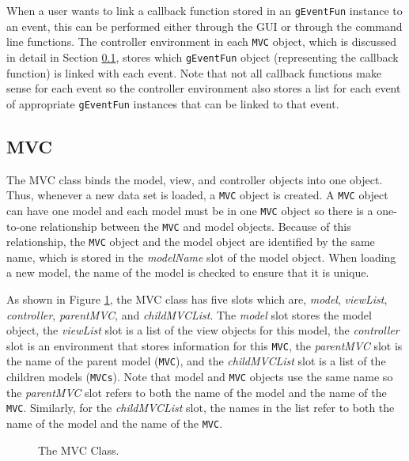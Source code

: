 \documentclass{article}[11pt]
\newcommand{\Robject}[1]{{\texttt{#1}}}
\newcommand{\Rslot}[1]{\textsl{#1}}
\newcommand{\Rclass}[1]{\textsf{#1}}
\begin{document}
When a user wants to link a callback function stored in an \Robject{gEventFun}
instance to an event, this can be performed either through the GUI or through
the command line functions.  The controller environment in each \Robject{MVC}
object, which is discussed in detail in Section \ref{Ssec:OneMVC},
stores which \Robject{gEventFun} object (representing the callback
function) is linked with each event.  Note that not all callback functions
make sense for each event so the controller environment also stores a list
for each event of appropriate \Robject{gEventFun} instances that can be linked
to that event.

\subsection{MVC}\label{Ssec:OneMVC}
 
The \Rclass{MVC} class binds the model, view, and
controller objects into one object.  Thus, whenever a new data set
is loaded, a \Robject{MVC} object is created.  A \Robject{MVC} object can have
one model and each model must be in one \Robject{MVC}
object so there is a one-to-one relationship between the \Robject{MVC} and
model objects.  Because of this relationship, the \Robject{MVC}
object and the model object are identified by the same name, which
is stored in the \Rslot{modelName} slot of the model object.  When
loading a new model, the name of the model is checked to
ensure that it is unique.

As shown in Figure \ref{Fig:MVCClass}, the \Rclass{MVC} class has five slots
which are, \Rslot{model}, \Rslot{viewList}, \Rslot{controller},
\Rslot{parentMVC}, and \Rslot{childMVCList}.  The \Rslot{model} slot stores
the model object, the \Rslot{viewList} slot is a list of the
view objects for this model, the \Rslot{controller} slot is an
environment that stores information for this \Robject{MVC}, the
\Rslot{parentMVC} slot is the name of the parent model
(\Robject{MVC}), and the \Rslot{childMVCList} slot is a list of the children
models (\Robject{MVCs}).  Note that model and
\Robject{MVC} objects use the same name so the \Rslot{parentMVC} slot refers
to both the name of the model and the name of the \Robject{MVC}.
Similarly, for the \Rslot{childMVCList} slot, the names in the list refer to
both the name of the model and the name of the \Robject{MVC}. 

\begin{figure}[ht]
  \begin{center}
    \caption{ The MVC Class. }
    \label{Fig:MVCClass}
  \end{center}
\end{figure}
\end{document}
